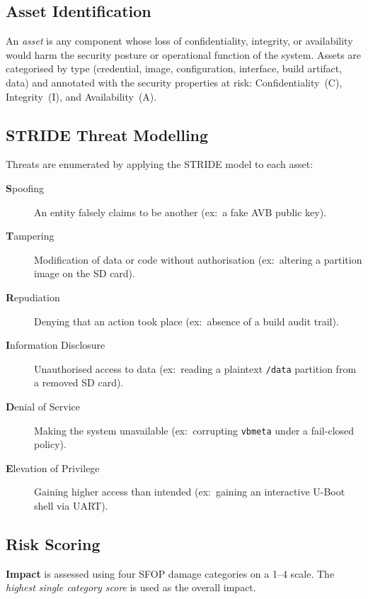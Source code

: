 \subsection{Asset Identification}

An \emph{asset} is any component whose loss of confidentiality, integrity, or availability would harm the security posture or operational function of the system. Assets are categorised by type (credential, image, configuration, interface, build artifact, data) and annotated with the security properties at risk: Confidentiality~(C), Integrity~(I), and Availability~(A).

\subsection{STRIDE Threat Modelling}

Threats are enumerated by applying the STRIDE model \cite{stride_microsoft} to each asset:

\begin{description}
    \item[\textbf{S}poofing] An entity falsely claims to be another (ex:\ a fake AVB public key).
    \item[\textbf{T}ampering] Modification of data or code without authorisation (ex:\ altering a partition image on the SD card).
    \item[\textbf{R}epudiation] Denying that an action took place (ex:\ absence of a build audit trail).
    \item[\textbf{I}nformation Disclosure] Unauthorised access to data (ex:\ reading a plaintext \texttt{/data} partition from a removed SD card).
    \item[\textbf{D}enial of Service] Making the system unavailable (ex:\ corrupting \texttt{vbmeta} under a fail-closed policy).
    \item[\textbf{E}levation of Privilege] Gaining higher access than intended (ex:\ gaining an interactive U-Boot shell via UART).
\end{description}

\subsection{Risk Scoring}

\textbf{Impact} is assessed using four SFOP damage categories \cite{iso_sae_21434} on a 1--4 scale. The \emph{highest single category score} is used as the overall impact.

